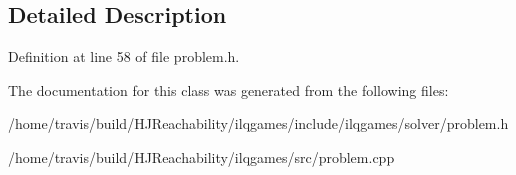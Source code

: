 \subsection{Detailed Description}


Definition at line 58 of file problem.\+h.



The documentation for this class was generated from the following files\+:\begin{DoxyCompactItemize}
\item 
/home/travis/build/\+H\+J\+Reachability/ilqgames/include/ilqgames/solver/problem.\+h\item 
/home/travis/build/\+H\+J\+Reachability/ilqgames/src/problem.\+cpp\end{DoxyCompactItemize}
